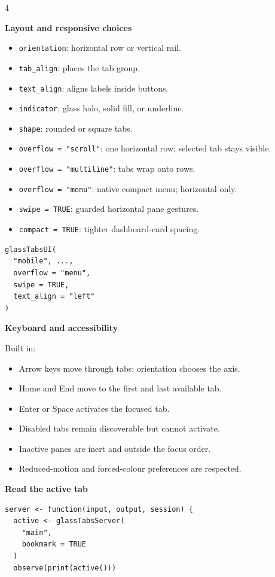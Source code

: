 \documentclass[9pt,a4paper]{article}
\newcommand{\gtarg}[1]{\texttt{\footnotesize\color{gtgreen}#1}}
\newcommand{\mysection}[1]{%
  \vspace{3pt}%
  \noindent\colorbox{sectionbg}{%
    \parbox{\dimexpr\linewidth-2\fboxsep\relax}{%
      \strut\textbf{\small\color{white}#1}\strut%
    }%
  }%
  \vspace{2pt}\par%
}
\begin{document}
\begin{multicols*}{4}
\mysection{Layout and responsive choices}

\begin{itemize}
  \item \gtarg{orientation}: horizontal row or vertical rail.
  \item \gtarg{tab\_align}: places the tab group.
  \item \gtarg{text\_align}: aligns labels inside buttons.
  \item \gtarg{indicator}: glass halo, solid fill, or underline.
  \item \gtarg{shape}: rounded or square tabs.
  \item \gtarg{overflow = "scroll"}: one horizontal row; selected tab stays visible.
  \item \gtarg{overflow = "multiline"}: tabs wrap onto rows.
  \item \gtarg{overflow = "menu"}: native compact menu; horizontal only.
  \item \gtarg{swipe = TRUE}: guarded horizontal pane gestures.
  \item \gtarg{compact = TRUE}: tighter dashboard-card spacing.
\end{itemize}

\begin{lstlisting}
glassTabsUI(
  "mobile", ...,
  overflow = "menu",
  swipe = TRUE,
  text_align = "left"
)
\end{lstlisting}

\columnbreak
\mysection{Keyboard and accessibility}

Built in:
\begin{itemize}
  \item Arrow keys move through tabs; orientation chooses the axis.
  \item Home and End move to the first and last available tab.
  \item Enter or Space activates the focused tab.
  \item Disabled tabs remain discoverable but cannot activate.
  \item Inactive panes are inert and outside the focus order.
  \item Reduced-motion and forced-colour preferences are respected.
\end{itemize}

\mysection{Read the active tab}

\begin{lstlisting}
server <- function(input, output, session) {
  active <- glassTabsServer(
    "main",
    bookmark = TRUE
  )
  observe(print(active()))


\end{lstlisting}
\end{multicols*}
\end{document}
